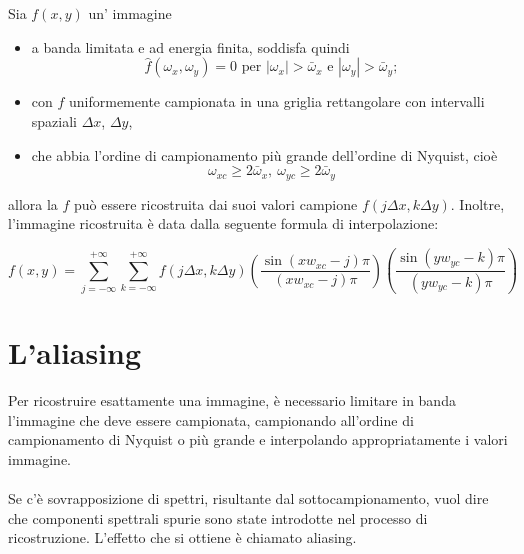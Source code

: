 \begin{theorem}
    Sia $f(x,y)$ un' immagine
    \begin{itemize}
        \item a banda limitata e ad energia finita, soddisfa quindi
              $$
                  \hat{f}(\omega_x,\omega_y) = 0 \text{ per } | \omega_x | >
                  \bar{\omega}_x \text{ e } | \omega_y | > \bar{\omega}_y;
              $$
        \item con $f$ uniformemente campionata in una griglia rettangolare con
              intervalli spaziali $\Delta x$, $\Delta y$,
        \item che abbia l'ordine di campionamento più grande dell'ordine di
              Nyquist, cioè
              $$
                  \omega_{xc} \geq 2 \bar{\omega}_x, \ \omega_{yc} \geq 2 \bar{\omega}_y
              $$
    \end{itemize}

    allora la $f$ può essere ricostruita dai suoi valori campione $f(j \Delta x,
        k \Delta y)$. Inoltre, l'immagine ricostruita è data dalla seguente formula
    di interpolazione:
\end{theorem}

$$
    f(x,y) = \sum_{j=-\infty}^{+\infty} \sum_{k=-\infty}^{+\infty} f(j \Delta
    x, k \Delta y) (\frac{\sin(xw_{xc}-j)\pi}{(xw_{xc}-j)\pi})
    (\frac{\sin(yw_{yc}-k)\pi}{(yw_{yc}-k)\pi})
$$

\section{L'aliasing}

Per ricostruire esattamente una immagine, è necessario limitare in banda
l'immagine che deve essere campionata, campionando all'ordine di campionamento
di Nyquist o più grande e interpolando appropriatamente i valori immagine.
\\\\Se c'è sovrapposizione di spettri, risultante dal sottocampionamento, vuol
dire che componenti spettrali spurie sono state introdotte nel processo di
ricostruzione. L'effetto che si ottiene è chiamato aliasing.

